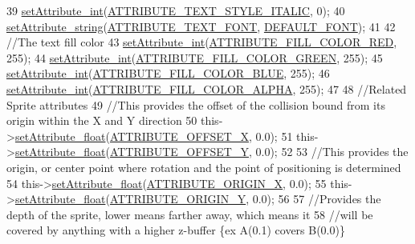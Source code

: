 \begin{DoxyCode}
39     \hyperlink{class_abstract_component_aca84c14d196467bda6aff90521b1ae7f}{setAttribute\_int}(\hyperlink{_a_e___attributes_8h_a3393f6b47bd2b686269135c1fa532216}{ATTRIBUTE\_TEXT\_STYLE\_ITALIC}, 0);
40     \hyperlink{class_abstract_component_a702ec2cc2624561ef51afcd9c8061fd2}{setAttribute\_string}(\hyperlink{_a_e___attributes_8h_a13b5d39e16142e79a137e0377f0f56cf}{ATTRIBUTE\_TEXT\_FONT}, 
      \hyperlink{_text_manager_8h_a0502f8673f5b0a113d593b9a84f5f775}{DEFAULT\_FONT});
41 
42     \textcolor{comment}{//The text fill color}
43     \hyperlink{class_abstract_component_aca84c14d196467bda6aff90521b1ae7f}{setAttribute\_int}(\hyperlink{_a_e___attributes_8h_a3725edfd1b846140eb49aa34b027b2cb}{ATTRIBUTE\_FILL\_COLOR\_RED}, 255);
44     \hyperlink{class_abstract_component_aca84c14d196467bda6aff90521b1ae7f}{setAttribute\_int}(\hyperlink{_a_e___attributes_8h_a44093150b0166936e44f0748babd201c}{ATTRIBUTE\_FILL\_COLOR\_GREEN}, 255);
45     \hyperlink{class_abstract_component_aca84c14d196467bda6aff90521b1ae7f}{setAttribute\_int}(\hyperlink{_a_e___attributes_8h_a7c1ee03e64d7b6dd251b709f0130cc62}{ATTRIBUTE\_FILL\_COLOR\_BLUE}, 255);
46     \hyperlink{class_abstract_component_aca84c14d196467bda6aff90521b1ae7f}{setAttribute\_int}(\hyperlink{_a_e___attributes_8h_a66939dddc263c09ff273450168b31918}{ATTRIBUTE\_FILL\_COLOR\_ALPHA}, 255);
47 
48     \textcolor{comment}{//Related Sprite attributes}
49     \textcolor{comment}{//This provides the offset of the collision bound from its origin within the X and Y direction}
50     this->\hyperlink{class_abstract_component_aadaf9dfbb371db5fb21f9c7cf2cbea98}{setAttribute\_float}(\hyperlink{_a_e___attributes_8h_aa003b6ad3f43053c9d43e1acc0098691}{ATTRIBUTE\_OFFSET\_X}, 0.0);
51     this->\hyperlink{class_abstract_component_aadaf9dfbb371db5fb21f9c7cf2cbea98}{setAttribute\_float}(\hyperlink{_a_e___attributes_8h_a8ebf91b8ee9dfdfad18bc10c3c42d564}{ATTRIBUTE\_OFFSET\_Y}, 0.0);
52 
53     \textcolor{comment}{//This provides the origin, or center point where rotation and the point of positioning is determined}
54     this->\hyperlink{class_abstract_component_aadaf9dfbb371db5fb21f9c7cf2cbea98}{setAttribute\_float}(\hyperlink{_a_e___attributes_8h_a5c5a5ae3ea4130db3dfd08029a17a17c}{ATTRIBUTE\_ORIGIN\_X}, 0.0);
55     this->\hyperlink{class_abstract_component_aadaf9dfbb371db5fb21f9c7cf2cbea98}{setAttribute\_float}(\hyperlink{_a_e___attributes_8h_af45315d7cdc2f4ecdb28d0a9d6bb15c7}{ATTRIBUTE\_ORIGIN\_Y}, 0.0);
56 
57     \textcolor{comment}{//Provides the depth of the sprite, lower means farther away, which means it}
58         \textcolor{comment}{//will be covered by anything with a higher z-buffer \{ex A(0.1) covers B(0.0)\}}

\end{DoxyCode}
